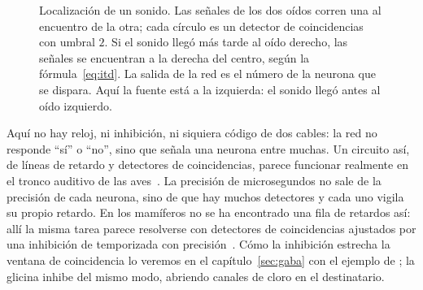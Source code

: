 \begin{figure}[t]
\centering
{}
\caption{Localización de un sonido. Las señales de los dos oídos corren una al encuentro de la otra; cada círculo es un detector de coincidencias con umbral $2$. Si el sonido llegó más tarde al oído derecho, las señales se encuentran a la derecha del centro, según la fórmula~\eqref{eq:itd}. La salida de la red es el número de la neurona que se dispara. Aquí la fuente está a la izquierda: el sonido llegó antes al oído izquierdo.}
\label{fig:itd}
\end{figure}

Aquí no hay reloj, ni inhibición, ni siquiera código de dos cables: la red no responde “sí” o “no”, sino que señala una neurona entre muchas. Un circuito así, de líneas de retardo y detectores de coincidencias, parece funcionar realmente en el tronco auditivo de las aves~\cite{Carr1990}. La precisión de microsegundos no sale de la precisión de cada neurona, sino de que hay muchos detectores y cada uno vigila su propio retardo. En los mamíferos no se ha encontrado una fila de retardos así: allí la misma tarea parece resolverse con detectores de coincidencias ajustados por una inhibición de  temporizada con precisión~\cite{Brand2002,Grothe2010}. Cómo la inhibición estrecha la ventana de coincidencia lo veremos en el capítulo~\ref{sec:gaba} con el ejemplo de ; la glicina inhibe del mismo modo, abriendo canales de cloro en el destinatario.

